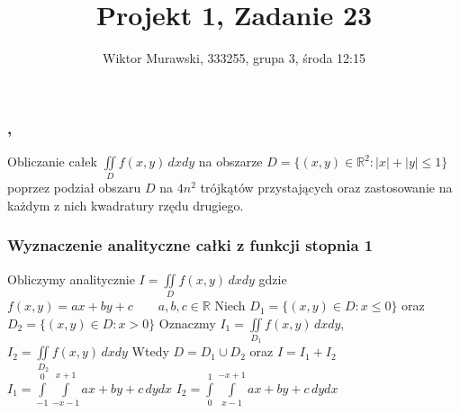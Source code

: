 \documentclass[9pt]{beamer}
\title{Projekt 1, Zadanie 23}
\author{Wiktor Murawski, 333255, grupa 3, środa 12:15}
\date{}
\newcommand{\n}{\newline}
\begin{document}
    \begin{frame}
        \frametitle{\insertauthor,\space\inserttitle}
        \begin{spacing}{2}
        Obliczanie całek $ \iint\limits_D f(x,y) \, dxdy $ na obszarze
        $  D = \{(x,y) \in \mathbb{R}^2 : |x| + |y| \leq 1\} $
        poprzez podział obszaru $ D $ na $ 4n^2 $ trójkątów przystających oraz
        zastosowanie na każdym z nich kwadratury rzędu drugiego.
        \end{spacing}
    \end{frame}

	\begin{frame}
    \frametitle{Wyznaczenie analityczne całki z funkcji stopnia 1}

        \begin{spacing}{2}
            Obliczymy analitycznie $ I = \iint\limits_D f(x,y) \, dx dy $ gdzie
            $ f(x,y) = ax + by + c \qquad a,b,c \in \mathbb{R}$ \n
            Niech $ D_1 = \{(x,y) \in D : x \leq 0\} $ oraz $ D_2 = \{(x,y) \in D : x > 0\} $ \n
            Oznaczmy $ I_1 = \iint\limits_{D_1} f(x,y) \, dx dy $, $ I_2 = \iint\limits_{D_2} f(x,y) \, dx dy $ \n
            Wtedy $ D = D_1 \cup D_2 $ oraz $ I = I_1 + I_2 $ \n
            $ I_1 = \int\limits_{-1}^{0}\int\limits_{-x-1}^{x+1} ax+by+c \, dy dx $ \qquad\n
            $ I_2 = \int\limits_{0}^{1}\int\limits_{x-1}^{-x+1} ax+by+c \, dy dx $ \n
        \end{spacing}

    \end{frame}
\end{document}
